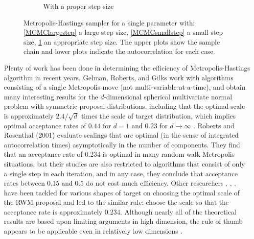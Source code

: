 \begin{figure}[h]
\begin{subfigure}[b]{0.32\textwidth}
    \caption{With a proper step size}\label{MCMCproperstep}
\end{subfigure}
\caption{Metropolis-Hastings sampler for a single parameter with: \ref{MCMClargestep} a large step size, \ref{MCMCsmallstep} a small step size, \ref{MCMCproperstep} an appropriate step size. The upper plots show the sample chain and lower plots indicate the autocorrelation for each case.}
\label{largesmallstepsize}
\end{figure}


Plenty of work has been done in determining the efficiency of Metropolis-Hastings algorithm in recent years. Gelman, Roberts, and Gilks \cite{gelman1996efficient} work with algorithms consisting of a single Metropolis move (not multi-variable-at-a-time), and obtain many interesting results for the $d$-dimensional spherical multivariate normal problem with symmetric proposal distributions, including that the optimal scale is approximately $2.4/\sqrt{d}$ times the scale of target distribution, which implies optimal acceptance rates of $0.44$ for $d = 1$ and $0.23$ for $d\rightarrow \infty$ \cite{gilks1995markov}. Roberts and Rosenthal (2001) \cite{roberts2001optimal} evaluate scalings that are optimal (in the sense of integrated autocorrelation times) asymptotically in the number of components. They find that an acceptance rate of 0.234 is optimal in many random walk Metropolis situations, but their studies are also restricted to algorithms that consist of only a single step in each iteration, and in any case, they conclude that acceptance rates between 0.15 and 0.5 do not cost much efficiency. Other researchers \cite{roberts1997weak} \cite{bedard2007weak}, \cite{beskos2009optimal}, \cite{sherlock2009optimal}, \cite{sherlock2013optimal} have been tackled for various shapes of target on choosing the optimal scale of the RWM proposal and led to the similar rule: choose the scale so that the acceptance rate is approximately 0.234. Although nearly all of the theoretical results are based upon limiting arguments in high dimension, the rule of thumb appears to be applicable even in relatively low dimensions \cite{sherlock2010random}. 



